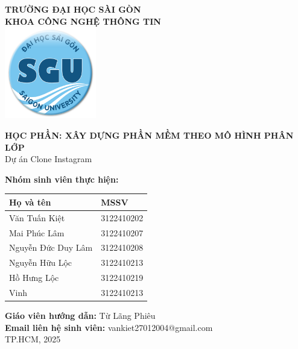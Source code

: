 \begin{titlepage}
    \centering
    {\LARGE \textbf{TRƯỜNG ĐẠI HỌC SÀI GÒN}} \\[0.2cm]
    {\Large \textbf{KHOA CÔNG NGHỆ THÔNG TIN}} \\[0.5cm]
    
    \vspace{0.5cm} 
    \includegraphics[width=4cm]{./img/logo.png} %
    \vspace{0.5cm} %
    
    {\Large \textbf{HỌC PHẦN: XÂY DỰNG PHẦN MỀM THEO MÔ HÌNH PHÂN LỚP}} \\[0.5cm]
    {\Large Dự án Clone Instagram} \\[0.5cm]

    \vspace{0.5cm} %
    
    \textbf{Nhóm sinh viên thực hiện:} \\[0.5cm]
    
    \begin{tabular}{|l|l|}
        \hline
        \textbf{Họ và tên} & \textbf{MSSV} \\ \hline
        Văn Tuấn Kiệt & 3122410202 \\ \hline
        Mai Phúc Lâm & 3122410207 \\ \hline
        Nguyễn Đức Duy Lâm & 3122410208 \\ \hline
        Nguyễn Hữu Lộc & 3122410213 \\ \hline
        Hồ Hưng Lộc & 3122410219 \\ \hline
        Vinh & 3122410213 \\ \hline
    \end{tabular}

    \vspace{0.5cm}

    \textbf{Giáo viên hướng dẫn:} Từ Lãng Phiêu \\[0.5cm]

    \textbf{Email liên hệ sinh viên:} vankiet27012004@gmail.com \\[0.5cm]
    
    \vfill
    {\Large TP.HCM, 2025}
\end{titlepage}

